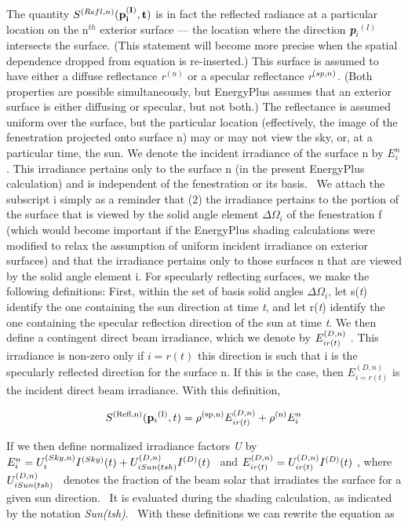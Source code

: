 The quantity \(S^{(Refl,n)} (\bf{p}_i^{(I)},t)\) is in fact the reflected radiance at a particular location on the n\(^{th}\) exterior surface --- the location where the direction \textbf{\emph{p}}\emph{\(_{i}\)}\(^{(I)}\) intersects the surface. (This statement will become more precise when the spatial dependence dropped from equation is re-inserted.) This surface is assumed to have either a diffuse reflectance \emph{r}\(^{(n)}\) or a specular reflectance \emph{r}\(^{(sp,\\ n)}\). (Both properties are possible simultaneously, but EnergyPlus assumes that an exterior surface is either diffusing or specular, but not both.) The reflectance is assumed uniform over the surface, but the particular location (effectively, the image of the fenestration projected onto surface n) may or may not view the sky, or, at a particular time, the sun. We denote the incident irradiance of the surface n by \(E_i^n\). This irradiance pertains only to the surface n (in the present EnergyPlus calculation) and is independent of the fenestration or its basis.~ We attach the subscript i simply as a reminder that (2) the irradiance pertains to the portion of the surface that is viewed by the solid angle element \(\Delta {\Omega_i}\) of the fenestration f (which would become important if the EnergyPlus shading calculations were modified to relax the assumption of uniform incident irradiance on exterior surfaces) and that the irradiance pertains only to those surfaces n that are viewed by the solid angle element i. For specularly reflecting surfaces, we make the following definitions: First, within the set of basis solid angles \(\Delta {\Omega_i}\), let s(\emph{t}) identify the one containing the sun direction at time \emph{t}, and let r(\emph{t}) identify the one containing the specular reflection direction of the sun at time \emph{t}. We then define a contingent direct beam irradiance, which we denote by \(E_{i{\rm{ }}r(t)}^{(D,n)}\) . This irradiance is non-zero only if \(i = r(t)\) this direction is such that i is the specularly reflected direction for the surface n. If this is the case, then \(E_{i = r(t)}^{(D,n)}\) is the incident direct beam irradiance. With this definition,

\begin{equation}
{S^{{\rm{(Refl, n)}}}}({{\bf{p}}_i}^{{\rm{(I)}}},t) = {\rho ^{{\rm{(sp, n)}}}}E_{i{\rm{ }}r(t)}^{(D,n)} + {\rho ^{{\rm{(n)}}}}E_i^n
\end{equation}

If we then define normalized irradiance factors \emph{U} by \(E_i^n = U_i^{(Sky,n)}{I^{(Sky)}}(t) + U_{i{\rm{ }}Sun(tsh)}^{(D,n)}{I^{(D)}}(t)\) ~and \(E_{i{\rm{ }}r(t)}^{(D,n)} = U_{i{\rm{ }}r(t)}^{(D,n)}{I^{(D)}}(t)\) , where \(U_{i{\rm{ }}Sun(tsh)}^{(D,n)}\) ~denotes the fraction of the beam solar that irradiates the surface for a given sun direction.~ It is evaluated during the shading calculation, as indicated by the notation \emph{Sun(tsh)}.~ With these definitions we can rewrite the equation as

